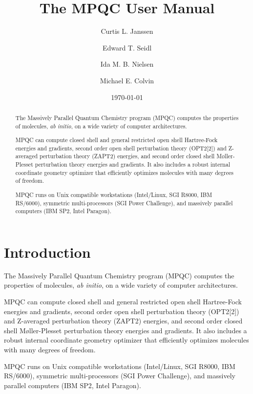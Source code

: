 \documentclass[letterpaper]{report}
\begin{document}
\title{The MPQC User Manual}

\author{Curtis L. Janssen \and Edward T. Seidl \and Ida M. B. Nielsen
        \and Michael E. Colvin}

\date{\today}

\maketitle

\begin{abstract}
The Massively Parallel Quantum Chemistry program (MPQC) computes
the properties of molecules, {\it ab initio}, on a wide variety
of computer architectures.

\begin{sloppypar}
MPQC can compute closed shell and general restricted open shell
Hartree-Fock energies and gradients, second order open shell
perturbation theory (OPT2[2]) and Z-averaged perturbation theory
(ZAPT2) energies, and second order closed shell M\o{}ller-Plesset
perturbation theory energies and gradients.  It also includes a
robust internal coordinate geometry optimizer that efficiently
optimizes molecules with many degrees of freedom.
\end{sloppypar}

MPQC runs on Unix compatible workstations (Intel/Linux, SGI R8000,
IBM RS/6000), symmetric multi-processors (SGI Power Challenge), and
massively parallel computers (IBM SP2, Intel Paragon).
\end{abstract}

\tableofcontents

\chapter{Introduction}
The Massively Parallel Quantum Chemistry program (MPQC) computes
the properties of molecules, {\it ab initio}, on a wide variety
of computer architectures.

MPQC can compute closed shell and general restricted open shell
Hartree-Fock energies and gradients, second order open shell
perturbation theory (OPT2[2]) and Z-averaged perturbation theory
(ZAPT2) energies, and second order closed shell M\o{}ller-Plesset
perturbation theory energies and gradients.  It also includes a
robust internal coordinate geometry optimizer that efficiently
optimizes molecules with many degrees of freedom.

MPQC runs on Unix compatible workstations (Intel/Linux, SGI R8000,
IBM RS/6000), symmetric multi-processors (SGI Power Challenge),
and massively parallel computers (IBM SP2, Intel Paragon).
\end{document}
